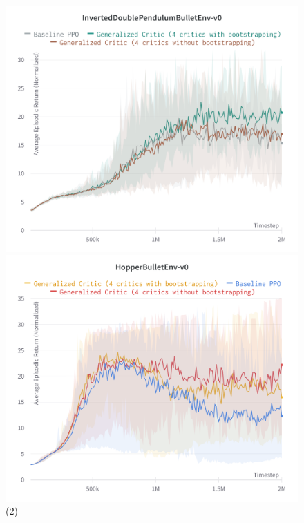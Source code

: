 \begin{figure}[!htb]
\begin{minipage}[b]{.5\linewidth}
\end{minipage}

\begin{minipage}[b]{.5\linewidth}
  \centering
  \centerline{\includegraphics[width=\linewidth]{images/inverteddoublependulum}}
\end{minipage}
\begin{minipage}[b]{.5\linewidth}
  \centering
  \centerline{\includegraphics[width=\linewidth]{images/hopper}}
\end{minipage}
\caption{(2)}
\label{exp2}
\end{figure}
